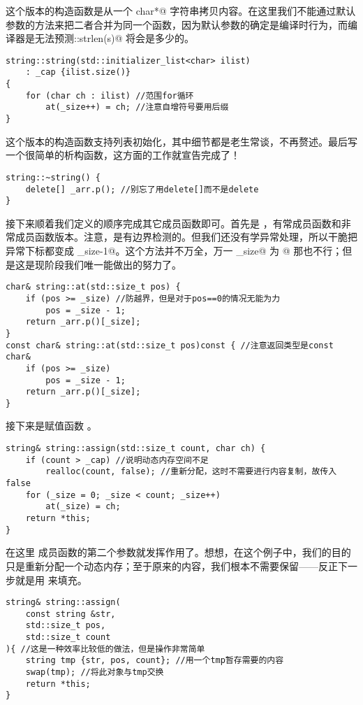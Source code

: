 这个版本的构造函数是从一个 \lstinline@const char*@ 字符串拷贝内容。在这里我们不能通过默认参数的方法来把二者合并为同一个函数，因为默认参数的确定是编译时行为，而编译器是无法预测\newline\lstinline@std::strlen(s)@ 将会是多少的。
\begin{lstlisting}
string::string(std::initializer_list<char> ilist)
    : _cap {ilist.size()}
{
    for (char ch : ilist) //范围for循环
        at(_size++) = ch; //注意自增符号要用后缀
}
\end{lstlisting}
这个版本的构造函数支持列表初始化，其中细节都是老生常谈，不再赘述。最后写一个很简单的析构函数，这方面的工作就宣告完成了！
\begin{lstlisting}
string::~string() {
    delete[] _arr.p(); //别忘了用delete[]而不是delete
}
\end{lstlisting}\par
接下来顺着我们定义的顺序完成其它成员函数即可。首先是 \lstinline@at@，有常成员函数和非常成员函数版本。注意，\lstinline@at@ 是有边界检测的。但我们还没有学异常处理，所以干脆把异常下标都变成 \lstinline@_size-1@。这个方法并不万全，万一 \lstinline@_size@ 为 @ 那也不行；但是这是现阶段我们唯一能做出的努力了。\par
\begin{lstlisting}
char& string::at(std::size_t pos) {
    if (pos >= _size) //防越界，但是对于pos==0的情况无能为力
        pos = _size - 1;
    return _arr.p()[_size];
}
const char& string::at(std::size_t pos)const { //注意返回类型是const char&
    if (pos >= _size)
        pos = _size - 1;
    return _arr.p()[_size];
}
\end{lstlisting}\par\pagebreak
接下来是赋值函数 \lstinline@assign@。
\begin{lstlisting}
string& string::assign(std::size_t count, char ch) {
    if (count > _cap) //说明动态内存空间不足
        realloc(count, false); //重新分配，这时不需要进行内容复制，故传入false
    for (_size = 0; _size < count; _size++)
        at(_size) = ch;
    return *this;
}
\end{lstlisting}
在这里 \lstinline@realloc@ 成员函数的第二个参数就发挥作用了。想想，在这个例子中，我们的目的只是重新分配一个动态内存；至于原来的内容，我们根本不需要保留——反正下一步就是用 \lstinline@char@ 来填充。
\begin{lstlisting}
string& string::assign(
    const string &str,
    std::size_t pos,
    std::size_t count
){ //这是一种效率比较低的做法，但是操作非常简单
    string tmp {str, pos, count}; //用一个tmp暂存需要的内容
    swap(tmp); //将此对象与tmp交换
    return *this;
}
\end{lstlisting}
